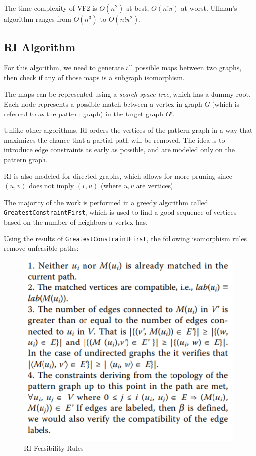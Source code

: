 \documentclass{article}
\begin{document}
  The time complexity of VF2 is $O(n^2)$ at best, $O(n!n)$ at worst.
  Ullman's algorithm ranges from $O(n^3)$ to $O(n!n^2)$.
  \cite{cordella}

  \subsection{RI Algorithm}

  For this algorithm, we need to generate all possible maps between two graphs, then check if any of those maps is a subgraph isomorphism.

  The maps can be represented using a \textit{search space tree}, which has a dummy root. Each node represents a possible match between a vertex in graph $G$ (which is referred to as the pattern graph) in the target graph $G'$.

  Unlike other algorithms, RI orders the vertices of the pattern graph in a way that maximizes the chance that a partial path will be removed. The idea is to introduce edge constraints as early as possible, and are modeled only on the pattern graph.

  RI is also modeled for directed graphs, which allows for more pruning since $(u,v)$ does not imply $(v, u)$ (where $u, v$ are vertices).

  The majority of the work is performed in a greedy algorithm called \texttt{GreatestConstraintFirst}, which is used to find a good sequence of vertices based on the number of neighbors a vertex has.

  Using the results of \texttt{GreatestConstraintFirst}, the following isomorphism rules remove unfeasible paths:

  \begin{figure}[H]
    \centering
    \includegraphics{images/ri_rules.png}
    \caption{RI Feasibility Rules}
    \label{ri_feas}
  \end{figure}
\end{document}
